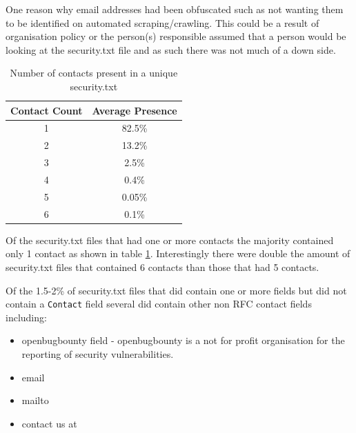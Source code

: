 \documentclass{mscreport}
\begin{document}
\noindent
One reason why email addresses had been obfuscated such as not wanting them to be identified on automated scraping/crawling. This could be a result of organisation policy or the person(s) responsible assumed that a person would be looking at the security.txt file and as such there was not much of a down side.

\begin{table}[H]
  \begin{center}
    \begin{tabular}{|c|c|}  %
      \hline
      \textbf{Contact Count} & \textbf{Average Presence}\\
      \hline
      1 & 82.5\%\\
      \hline
      2 & 13.2\%\\
      \hline
      3 & 2.5\%\\
      \hline
      4 & 0.4\%\\
      \hline
      5 & 0.05\%\\
      \hline
      6 & 0.1\%\\
      \hline
    \end{tabular}
    \caption{Number of contacts present in a unique security.txt}
    \label{table:security_txt_by_contact_count} %
  \end{center}
\end{table}

\noindent
Of the security.txt files that had one or more contacts the majority contained only 1 contact as shown in table \ref{table:security_txt_by_contact_count}. Interestingly there were double the amount of security.txt files that contained 6 contacts than those that had 5 contacts.

\vspace{0.3cm} \noindent
Of the 1.5-2\% of security.txt files that did contain one or more fields but did not contain a \texttt{Contact} field several did contain other non RFC contact fields including:

\begin{itemize}
	\setlength\itemsep{0.01em}
    \item openbugbounty field - openbugbounty is a not for profit organisation for the reporting of security vulnerabilities.
    \item email
    \item mailto
    \item contact us at
\end{itemize}
\end{document}
